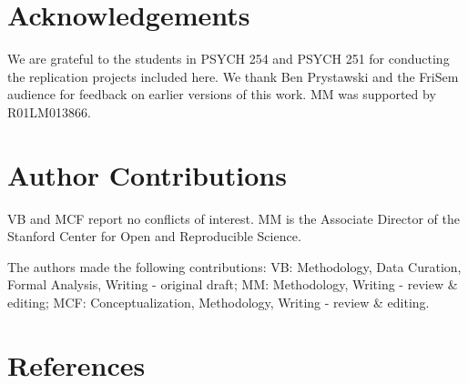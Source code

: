 \documentclass[
  english,
  a4paper,
]{article}
\begin{document}
\section*{Acknowledgements}\label{acknowledgements}

We are grateful to the students in PSYCH 254 and PSYCH 251 for conducting the replication projects included here. We thank Ben Prystawski and the FriSem audience for feedback on earlier versions of this work. MM was supported by R01LM013866.

\section*{Author Contributions}\label{author-contributions}

VB and MCF report no conflicts of interest. MM is the Associate Director of the Stanford Center for Open and Reproducible Science.

The authors made the following contributions: VB: Methodology, Data Curation, Formal Analysis, Writing - original draft;
MM: Methodology, Writing - review \& editing;
MCF: Conceptualization, Methodology, Writing - review \& editing.

\section*{References}\label{references}
\end{document}
